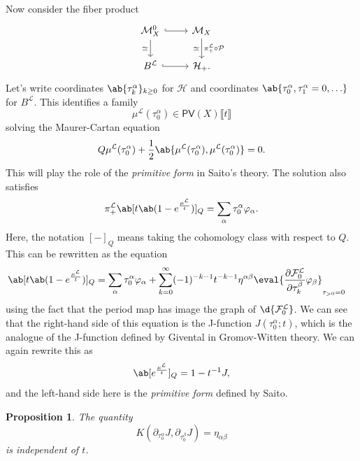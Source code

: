 \documentclass[article,10pt,oneside,oldfontcommands]{memoir}
\newtheorem{prop}[thm]{Proposition}
\theoremstyle{definition}
\theoremstyle{remark}
\theoremstyle{plain}
\theoremstyle{definition}
\theoremstyle{remark}
\newcommand{\mc}[1]{\mathcal{#1}}
\newcommand{\ms}[1]{\mathsf{#1}}
\newcommand{\1}{\mathbf{1}}
\newcommand{\2}{\mathbf{2}}
\newcommand{\3}{\mathbf{3}}
\newcommand{\ps}[1]{\lBrack #1 \rBrack}
\begin{document}
Now consider the fiber product
\begin{equation*}
\begin{tikzcd}
    \mc{M}_X^0 \ar[hookrightarrow]{r} \ar{d}[swap]{\simeq} & \mc{M}_X \ar{d}{\pi_+^{\mc{L}} \circ \mc{P}}[swap]{\simeq} \\
    B^{\mc{L}} \ar[hookrightarrow]{r} & \mc{H}_+.
\end{tikzcd}
\end{equation*}
Let's write coordinates \(\ab\{ \tau_k^{\alpha}\}_{k \geq 0}\) for \(\mc{H}\) and coordinates \(\ab\{\tau_0^{\alpha}, \tau_1^{\alpha} = 0, \ldots \}\) for \(B^{\mc{L}}\). This identifies a family 
\[ \mu^{\mc{L}}(\tau_0^{\alpha}) \in \ms{PV}(X) \ps{t} \]
solving the Maurer-Cartan equation
\[ Q \mu^{\mc{L}}(\tau_0^{\alpha}) + \frac{1}{2} \ab\{\mu^{\mc{L}}(\tau_0^{\alpha}), \mu^{\mc{L}}(\tau_0^{\alpha})\} = 0. \]
This will play the role of the \textit{primitive form} in Saito's theory. The solution also satisfies
\[ \pi_+^{\mc{L}} \ab[t \ab(1-e^{\frac{\mu^{\mc{L}}}{t}})]_Q = \sum_{\alpha} \tau_0^{\alpha} \varphi_{\alpha}. \]
Here, the notation \([-]_Q\) means taking the cohomology class with respect to \(Q\). This can be rewritten as the equation
\begin{align*}
    \ab[t \ab(1-e^{\frac{\mu^{\mc{L}}}{t}})]_Q &= \sum_{\alpha} \tau_0^{\alpha} \varphi_{\alpha} + \sum_{k=0}^{\infty} (-1)^{-k-1} t^{-k-1} \eta^{\alpha\beta} \eval{\pdv{\mc{F}_0^{\mc{L}}}{\tau_k^{\beta}} \varphi_{\beta}}_{\tau_{>0} = 0}
\end{align*}
using the fact that the period map has image the graph of \(\d{\mc{F}_0^{\mc{L}}}\). We can see that the right-hand side of this equation is the J-function \(J(\tau_0^{\alpha}; t)\), which is the analogue of the J-function defined by Givental in Gromov-Witten theory. We can again rewrite this as
\[ \ab[e^{\frac{\mu^{\mc{L}}}{t}}]_Q = 1 - t^{-1} J, \]
and the left-hand side here is the \textit{primitive form} defined by Saito.

\begin{prop}
    The quantity
    \[ K(\partial_{\tau_0^{\alpha}} J, \partial_{\tau_0^{\beta}} J) = \eta_{\alpha \beta} \]
    is independent of \(t\).
\end{prop}
\end{document}

